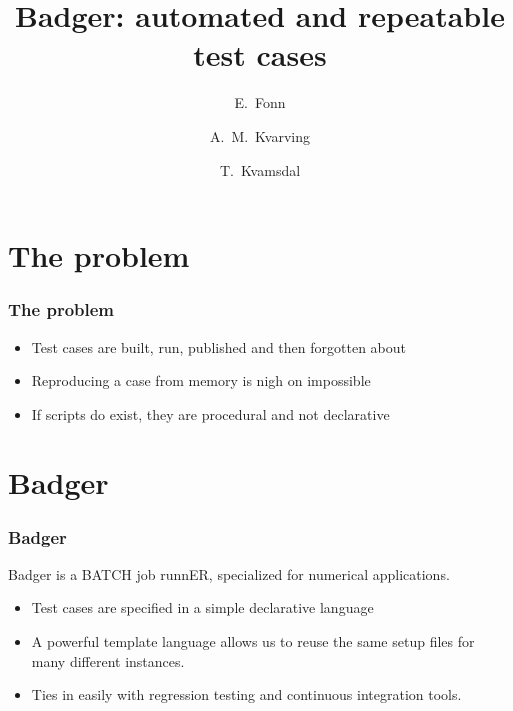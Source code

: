 \documentclass{beamer}
\begin{document}
\title[Badger]{Badger: automated and repeatable test cases}
\author[E. Fonn]{
  E.~Fonn \and
  A.~M.~Kvarving \and
  T.~Kvamsdal \and
}
\date[October 2015]{}

\newcommand{\rmc}{{\text{c}}}
\newcommand{\rmf}{{\text{f}}}
\newcommand{\rmt}{{\text{t}}}
\newcommand{\rmu}{{\text{u}}}
\newcommand{\rmq}{{\text{q}}}
\newcommand{\rmv}{{\text{v}}}


\begin{frame}
  \titlepage{}
\end{frame}

\section{The problem}

\begin{frame}
  \frametitle{The problem}

  \begin{itemize}
  \item Test cases are built, run, published and then forgotten about
  \item Reproducing a case from memory is nigh on impossible
  \item If scripts do exist, they are procedural and not declarative
  \end{itemize}
\end{frame}

\section{Badger}

\begin{frame}
  \frametitle{Badger}

  Badger is a BATCH job runnER, specialized for numerical applications.

  \begin{itemize}
  \item Test cases are specified in a simple declarative language
  \item A powerful template language allows us to reuse the same setup files for
    many different instances.
  \item Ties in easily with regression testing and continuous integration tools.
  \end{itemize}
\end{frame}
\end{document}
